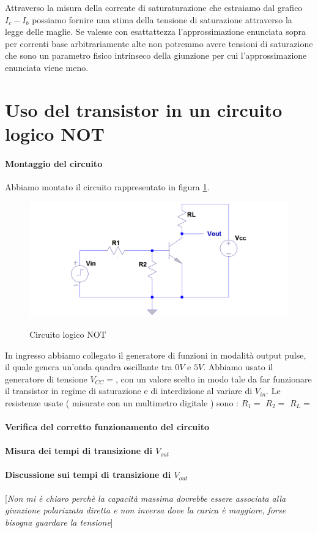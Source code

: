 \documentclass[10pt,a4paper]{article}
\newcommand{\rem}[1]{[\emph{#1}]}
\begin{document}
Attraverso la misura della corrente di saturaturazione che estraiamo dal grafico $I_c - I_b$ possiamo fornire una stima della tensione di saturazione attraverso la legge delle maglie. Se valesse con esattattezza l'approssimazione enunciata sopra per correnti base arbitrariamente alte non potremmo avere tensioni di saturazione che sono un parametro fisico intrinseco della giunzione per cui l'approssimazione enunciata viene meno.
 
\section{Uso del transistor in un circuito logico NOT }
\paragraph{Montaggio del circuito}
Abbiamo montato il circuito rappresentato in  figura \ref{circuito2}.
\begin{figure}[!htb]
  \centering
  \includegraphics[scale=0.4]{circuito2} \label{circuito2}
\caption{Circuito logico NOT}
\label{circuito2}
\end{figure} 

In ingresso abbiamo collegato  il generatore di funzioni in modalità output pulse, il quale genera un’onda quadra oscillante tra $0 V$ e $5 V$. Abbiamo usato  il generatore di tensione $V_{CC}=$, con un valore scelto in modo tale da far funzionare il transistor  in regime di saturazione e di interdizione al variare di $V_{in}$. Le resistenze usate ( misurate con un multimetro digitale ) sono : $R_1=$ $R_2=$ $R_L=$


\paragraph{Verifica del corretto funzionamento del circuito}
\paragraph{Misura dei tempi di transizione di $V_{out}$ }

\paragraph{Discussione sui tempi di transizione di $ V_{out}$}

\rem{Non mi è chiaro perchè la capacità massima dovrebbe essere associata alla giunzione polarizzata diretta e non inversa dove la carica è maggiore, forse bisogna guardare la tensione}
\end{document}
